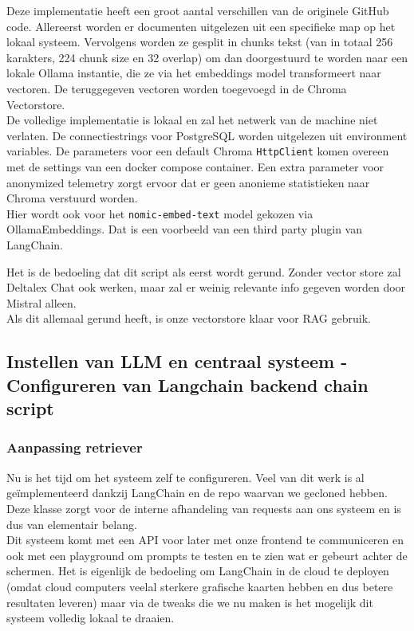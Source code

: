 \newpage
Deze implementatie heeft een groot aantal verschillen van de originele GitHub code. Allereerst worden er documenten uitgelezen uit een specifieke map op het lokaal systeem.
Vervolgens worden ze gesplit in chunks tekst (van in totaal 256 karakters, 224 chunk size en 32 overlap) om dan doorgestuurd te worden naar een lokale Ollama instantie,
die ze via het embeddings model transformeert naar vectoren. De teruggegeven vectoren worden toegevoegd in de Chroma Vectorstore. \\

De volledige implementatie is lokaal en zal het netwerk van de machine niet verlaten.
De connectiestrings voor PostgreSQL worden uitgelezen uit environment variables.
De parameters voor een default Chroma \lstinline{HttpClient} komen overeen met de settings van een docker compose container.
Een extra parameter voor anonymized telemetry zorgt ervoor dat er geen anonieme statistieken naar Chroma verstuurd worden. \\

Hier wordt ook voor het \lstinline{nomic-embed-text} model gekozen via OllamaEmbeddings.
Dat is een voorbeeld van een third party plugin van LangChain.

Het is de bedoeling dat dit script als eerst wordt gerund. Zonder vector store zal Deltalex Chat ook werken, maar zal er weinig relevante info gegeven worden door Mistral alleen.\\
Als dit allemaal gerund heeft, is onze vectorstore klaar voor RAG gebruik.

\newpage
\subsection{Instellen van LLM en centraal systeem - Configureren van Langchain backend chain script}
\subsubsection{Aanpassing retriever}

Nu is het tijd om het systeem zelf te configureren. Veel van dit werk is al geïmplementeerd dankzij LangChain en de repo waarvan we gecloned hebben.
Deze klasse zorgt voor de interne afhandeling van requests aan ons systeem en is dus van elementair belang. \\

Dit systeem komt met een API voor later met onze frontend te communiceren en ook met een playground om prompts te testen en te zien wat er gebeurt achter de schermen.
Het is eigenlijk de bedoeling om LangChain in de cloud te deployen (omdat cloud computers veelal sterkere grafische kaarten hebben en dus betere resultaten leveren)
maar via de tweaks die we nu maken is het mogelijk dit systeem volledig lokaal te draaien.\\

